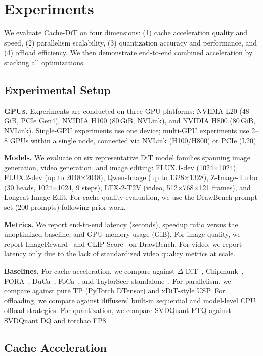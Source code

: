 \documentclass[10pt]{article}
\begin{document}
\section{Experiments}

We evaluate Cache-DiT on four dimensions: (1) cache acceleration quality and speed, (2) parallelism scalability, (3) quantization accuracy and performance, and (4) offload efficiency. We then demonstrate end-to-end combined acceleration by stacking all optimizations.

\subsection{Experimental Setup}

\textbf{GPUs.} Experiments are conducted on three GPU platforms: NVIDIA L20 (48\,GiB, PCIe Gen4), NVIDIA H100 (80\,GiB, NVLink), and NVIDIA H800 (80\,GiB, NVLink). Single-GPU experiments use one device; multi-GPU experiments use 2--8 GPUs within a single node, connected via NVLink (H100/H800) or PCIe (L20).

\textbf{Models.} We evaluate on six representative DiT model families spanning image generation, video generation, and image editing: FLUX.1-dev (1024$\times$1024), FLUX.2-dev (up to 2048$\times$2048), Qwen-Image (up to 1328$\times$1328), Z-Image-Turbo (30 heads, 1024$\times$1024, 9 steps), LTX-2-T2V (video, 512$\times$768$\times$121 frames), and Longcat-Image-Edit. For cache quality evaluation, we use the DrawBench prompt set (200 prompts) following prior work.

\textbf{Metrics.} We report end-to-end latency (seconds), speedup ratio versus the unoptimized baseline, and GPU memory usage (GiB). For image quality, we report ImageReward~\cite{xu2024imagereward} and CLIP Score~\cite{radford2021clip} on DrawBench. For video, we report latency only due to the lack of standardized video quality metrics at scale.

\textbf{Baselines.} For cache acceleration, we compare against $\Delta$-DiT~\cite{chen2024deltadit}, Chipmunk~\cite{silveria2025chipmunk}, FORA~\cite{selvaraju2024fora}, DuCa~\cite{zou2024duca}, FoCa~\cite{zheng2025foca}, and TaylorSeer standalone~\cite{liu2025taylorseer}. For parallelism, we compare against pure TP (PyTorch DTensor) and xDiT-style USP. For offloading, we compare against diffusers' built-in sequential and model-level CPU offload strategies. For quantization, we compare SVDQuant PTQ against SVDQuant DQ and torchao FP8.

\subsection{Cache Acceleration}
\end{document}
